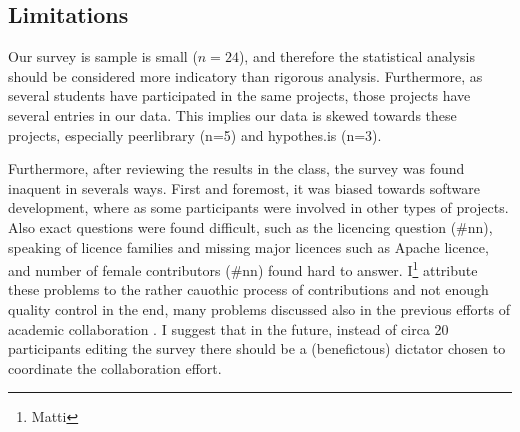 \subsection{Limitations}
\label{sec:limitations}

Our survey is sample is small ($n=24$), and therefore the statistical analysis should be considered more indicatory than rigorous analysis. Furthermore, as several students have participated in the same projects, those projects have several entries in our data. This implies our data is skewed towards these projects, especially peerlibrary (n=5) and hypothes.is (n=3).

Furthermore, after reviewing the results in the class, the survey was found inaquent in severals ways. First and foremost, it was biased towards software development, where as some participants were involved in other types of projects. Also exact questions were found difficult, such as the licencing question (\#nn), speaking of licence families and missing major licences such as Apache licence, and number of female contributors (\#nn) found hard to answer. I\footnote{Matti} attribute these problems to the rather cauothic process of contributions and not enough quality control in the end, many problems discussed also in the previous efforts of academic collaboration \cite{Tomlinson2012}. I suggest that in the future, instead of circa 20 participants editing the survey there should be a (benefictous) dictator chosen to coordinate the collaboration effort.